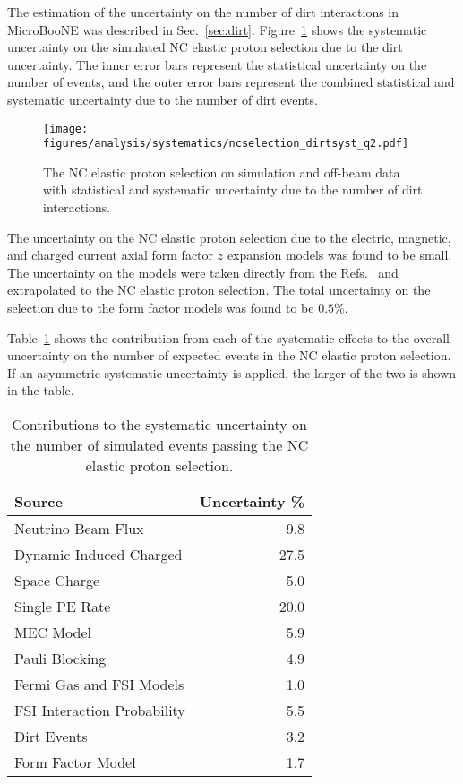     The estimation of the uncertainty on the number of dirt interactions in
    MicroBooNE was described in Sec.~\ref{sec:dirt}. Figure~\ref{fig:systdirt}
    shows the systematic uncertainty on the simulated NC elastic proton
    selection due to the dirt uncertainty. The inner error bars represent the
    statistical uncertainty on the number of events, and the outer error bars
    represent the combined statistical and systematic uncertainty due to the
    number of dirt events.
    \begin{figure}[ht]
      \centering
      \texttt{[image: figures/analysis/systematics/ncselection\_dirtsyst\_q2.pdf]}
      \caption{The NC elastic proton selection on simulation and off-beam data
      with statistical and systematic uncertainty due to the number of dirt
      interactions.}
      \label{fig:systdirt}
    \end{figure}

    The uncertainty on the NC elastic proton selection due to the electric,
    magnetic, and charged current axial form factor $z$ expansion models was
    found to be small. The uncertainty on the models were taken directly from
    the Refs.~\cite{Ye:2017gyb,Meyer:2016oeg} and extrapolated to the NC elastic
    proton selection. The total uncertainty on the selection due to the form
    factor models was found to be $0.5\%$.

    Table~\ref{tab:systuncertainties} shows the contribution from each of the
    systematic effects to the overall uncertainty on the number of expected
    events in the NC elastic proton selection. If an asymmetric systematic
    uncertainty is applied, the larger of the two is shown in the table.
    \begin{table}[ht]
      \caption{Contributions to the systematic uncertainty on the number of
      simulated events passing the NC elastic proton selection.
      \label{tab:systuncertainties}}
      \centering
      \begin{tabularx}{9cm}{ l r }
        \hline
        Source & Uncertainty \% \\
        \hline
        Neutrino Beam Flux & 9.8 \\
        \hline
        Dynamic Induced Charged & 27.5 \\
        Space Charge & 5.0 \\
        Single PE Rate & 20.0 \\
        \hline
        MEC Model & 5.9 \\
        Pauli Blocking & 4.9 \\
        Fermi Gas and FSI Models & 1.0 \\
        FSI Interaction Probability & 5.5 \\
        \hline
        Dirt Events & 3.2 \\
        \hline
        Form Factor Model & 1.7 \\
        \hline
      \end{tabularx}
    \end{table}

